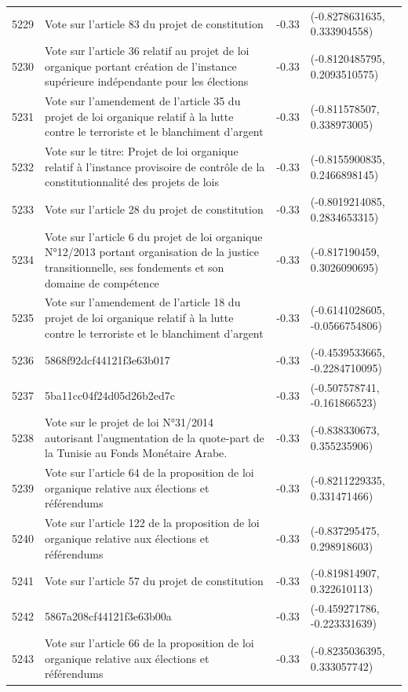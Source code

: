 \begin{table}[ht]
\begin{tabular}{rlrl}
  5229 & Vote sur l'article 83 du projet de constitution & -0.33 & (-0.8278631635, 0.333904558) \\ 
  5230 & Vote sur l'article 36 relatif au projet de loi organique portant création de l'instance supérieure indépendante pour les élections & -0.33 & (-0.8120485795, 0.2093510575) \\ 
  5231 & Vote sur l'amendement de l'article 35 du projet de loi organique relatif à la lutte contre le terroriste et le blanchiment d'argent & -0.33 & (-0.811578507, 0.338973005) \\ 
  5232 & Vote sur le titre: Projet de loi organique relatif à l'instance provisoire de contrôle de la constitutionnalité des projets de lois & -0.33 & (-0.8155900835, 0.2466898145) \\ 
  5233 & Vote sur l'article 28 du projet de constitution & -0.33 & (-0.8019214085, 0.2834653315) \\ 
  5234 & Vote sur l'article 6 du projet de loi organique N°12/2013 portant organisation de la justice transitionnelle, ses fondements et son domaine de compétence & -0.33 & (-0.817190459, 0.3026090695) \\ 
  5235 & Vote sur l'amendement de l'article 18 du projet de loi organique relatif à la lutte contre le terroriste et le blanchiment d'argent & -0.33 & (-0.6141028605, -0.0566754806) \\ 
  5236 & 5868f92dcf44121f3e63b017 & -0.33 & (-0.4539533665, -0.2284710095) \\ 
  5237 & 5ba11cc04f24d05d26b2ed7c & -0.33 & (-0.507578741, -0.161866523) \\ 
  5238 & Vote sur le projet de loi N°31/2014 autorisant l'augmentation de la quote-part de la Tunisie au Fonds Monétaire Arabe. & -0.33 & (-0.838330673, 0.355235906) \\ 
  5239 & Vote sur l'article 64 de la proposition de loi organique relative aux élections et référendums & -0.33 & (-0.8211229335, 0.331471466) \\ 
  5240 & Vote sur l'article 122 de la proposition de loi organique relative aux élections et référendums & -0.33 & (-0.837295475, 0.298918603) \\ 
  5241 & Vote sur l'article 57 du projet de constitution & -0.33 & (-0.819814907, 0.322610113) \\ 
  5242 & 5867a208cf44121f3e63b00a & -0.33 & (-0.459271786, -0.223331639) \\ 
  5243 & Vote sur l'article 66 de la proposition de loi organique relative aux élections et référendums & -0.33 & (-0.8235036395, 0.333057742) \\ 

\end{tabular}
\end{table}

